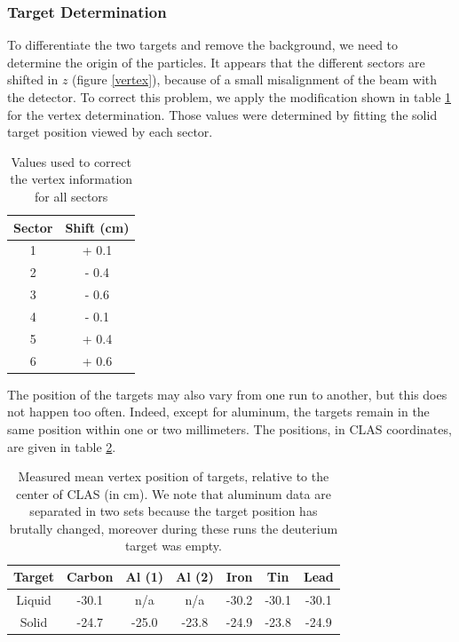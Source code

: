 \subsubsection{Target Determination}

To differentiate the two targets and remove the background, we need to 
determine the origin of the particles. It appears that the different sectors 
are shifted in $z$ (figure \ref{vertex}), because of a small misalignment of 
the beam with the detector. To correct this problem, we apply the modification shown in table 
\ref{tab:vertex} for the vertex determination. Those values were determined by 
fitting the solid target position viewed by each sector.

\begin{table}[p]
  \centering
  \begin{tabular}{@{} cc @{}}
    \hline
    Sector & Shift (cm) \\ 
    \hline
    1 & + 0.1 \\ 
    2 & - 0.4 \\ 
    3 & - 0.6 \\ 
    4 & - 0.1 \\ 
    5 & + 0.4 \\ 
    6 & + 0.6 \\ 
    \hline
  \end{tabular}
  \caption{Values used to correct the vertex information for all sectors}
  \label{tab:vertex}
\end{table}

The position of the targets may also vary from one run to another, but 
this does not happen too often. Indeed, except for aluminum, the targets remain in 
the same position within one or two millimeters. The positions, in CLAS 
coordinates, are given in table \ref{tab:targets}.

\begin{table}[p]
  \centering
  \begin{tabular}{|c|c|c|c|c|c|c|}
    \hline
    Target & Carbon & Al (1) & Al (2) & Iron   & Tin    & Lead   \\ 
    \hline \hline
    Liquid & -30.1  & n/a    & n/a    & -30.2  & -30.1  & -30.1  \\ 
    Solid  & -24.7  & -25.0  & -23.8  & -24.9  & -23.8  & -24.9  \\
    \hline
  \end{tabular}
  \caption{Measured mean vertex position of targets, relative to the center of 
           CLAS (in cm). We note that aluminum data are separated in two sets because the 
           target position has brutally changed, moreover
           during these runs the deuterium target was empty.}
  \label{tab:targets}
\end{table}

